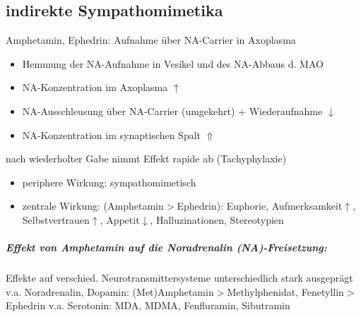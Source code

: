 \documentclass[10pt,a4paper]{report}
\begin{document}
\subsection{indirekte Sympathomimetika}
Amphetamin, Ephedrin: Aufnahme über NA-Carrier in Axoplasma 
\begin{itemize}
	\item Hemmung der NA-Aufnahme in Vesikel und des NA-Abbaus d. MAO 
	\item NA-Konzentration im Axoplasma $\uparrow$
	\item NA-Ausschleusung über NA-Carrier (umgekehrt) + Wiederaufnahme $\downarrow$
	\item NA-Konzentration im synaptischen Spalt $\Uparrow$
\end{itemize}
nach wiederholter Gabe nimmt Effekt rapide ab (Tachyphylaxie)
\begin{itemize}	
	\item periphere Wirkung: sympathomimetisch
	\item zentrale Wirkung: (Amphetamin$>$Ephedrin): Euphorie, Aufmerksamkeit$\uparrow$,	Selbstvertrauen$\uparrow$, Appetit$\downarrow$, Halluzinationen, Stereotypien
\end{itemize}
\subparagraph{Effekt von Amphetamin auf die Noradrenalin (NA)-Freisetzung:}
Effekte auf verschied. Neurotransmittersysteme unterschiedlich stark ausgeprägt v.a. Noradrenalin, Dopamin: 
(Met)Amphetamin$>$Methylphenidat, Fenetyllin$>$ Ephedrin
v.a. Serotonin: MDA, MDMA, Fenfluramin, Sibutramin
\end{document}
